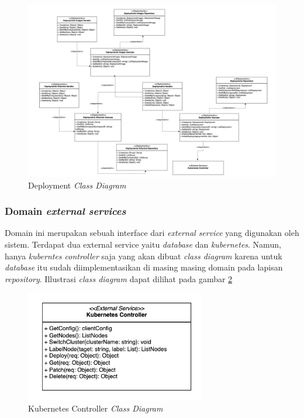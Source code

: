 \begin{figure}[ht]
  \centering
  \includegraphics[width=1\textwidth]{resources/chapter-3/class/deployment-class-diagram.jpg}
  \caption{Deployment \textit{Class Diagram}}
  \label{fig:deployment-class-diagram}
\end{figure}

\subsubsection{Domain \textit{external services}}

Domain ini merupakan sebuah interface dari \textit{external service} yang digunakan oleh sistem. Terdapat dua external service yaitu \textit{database} dan \textit{kubernetes}. Namun, hanya \textit{kuberntes controller} saja yang akan dibuat \textit{class diagram} karena untuk \textit{database} itu sudah diimplementasikan di masing masing domain pada lapisan \textit{repository}. Illustrasi \textit{class diagram} dapat dilihat pada gambar \ref{fig:kubernetes-controller-class-diagram}

\begin{figure}[ht]
  \centering
  \includegraphics[width=0.7\textwidth]{resources/chapter-3/class/kubernetes-controller}
  \caption{Kubernetes Controller \textit{Class Diagram}}
  \label{fig:kubernetes-controller-class-diagram}
\end{figure}
